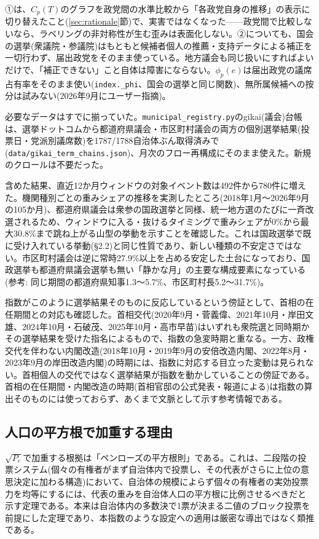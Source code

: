 \documentclass[a4paper,11pt]{ltjsarticle}
\begin{document}
①は、$C_p(T)$のグラフを政党間の水準比較から「各政党自身の推移」の表示に切り替えたこと(\ref{sec:rationale}節)で、実害ではなくなった——政党間で比較しないなら、ラベリングの非対称性が生む歪みは表面化しない。②についても、国会の選挙(衆議院・参議院)はもともと候補者個人の推薦・支持データによる補正を一切行わず、届出政党をそのまま使っている。地方議会も同じ扱いにすればよいだけで、「補正できない」こと自体は障害にならない。$\phi_p(e)$は届出政党の議席占有率をそのまま使い(\texttt{index.\_phi}、国会の選挙と同じ関数)、無所属候補への按分は試みない(2026年9月にユーザー指摘)。

必要なデータはすでに揃っていた。\texttt{municipal\_registry.py}のgikai(議会)台帳は、選挙ドットコムから都道府県議会・市区町村議会の両方の個別選挙結果(投票日・党派別議席数)を1787/1788自治体ぶん取得済みで(\texttt{data/gikai\_term\_chains.json})、月次のフロー再構成にそのまま使えた。新規のクロールは不要だった。

含めた結果、直近12か月ウィンドウの対象イベント数は492件から780件に増えた。機関種別ごとの重みシェアの推移を実測したところ(2018年1月〜2026年9月の105か月)、都道府県議会は衆参の国政選挙と同様、統一地方選のたびに一斉改選されるため、ウィンドウに入る・抜けるタイミングで重みシェアが0\%から最大30.8\%まで跳ね上がる山型の挙動を示すことを確認した。これは国政選挙で既に受け入れている挙動(\S2.2)と同じ性質であり、新しい種類の不安定さではない。市区町村議会は逆に常時27.9\%以上を占める安定した土台になっており、国政選挙も都道府県議会選挙も無い「静かな月」の主要な構成要素になっている(参考: 同じ期間の都道府県知事1.3〜5.7\%、市区町村長5.2〜31.7\%)。

指数がこのように選挙結果そのものに反応しているという傍証として、首相の在任期間との対応も確認した。首相交代(2020年9月・菅義偉、2021年10月・岸田文雄、2024年10月・石破茂、2025年10月・高市早苗)はいずれも衆院選と同時期かその選挙結果を受けた指名によるもので、指数の急変時期と重なる。一方、政権交代を伴わない内閣改造(2018年10月・2019年9月の安倍改造内閣、2022年8月・2023年9月の岸田改造内閣)の時期には、指数に対応する目立った変動は見られない。首相個人の交代ではなく選挙結果が指数を動かしていることの傍証である。首相の在任期間・内閣改造の時期(首相官邸の公式発表・報道による)は指数の算出そのものには使っておらず、あくまで文脈として示す参考情報である。

\subsection{人口の平方根で加重する理由}

$\sqrt{P_e}$で加重する根拠は「ペンローズの平方根則」である。これは、二段階の投票システム(個々の有権者がまず自治体内で投票し、その代表がさらに上位の意思決定に加わる構造)において、自治体の規模によらず個々の有権者の実効投票力を均等にするには、代表の重みを自治体人口の平方根に比例させるべきだと示す定理である。本来は自治体内の多数決で1票が決まる二値のブロック投票を前提にした定理であり、本指数のような設定への適用は厳密な導出ではなく類推である。
\end{document}
